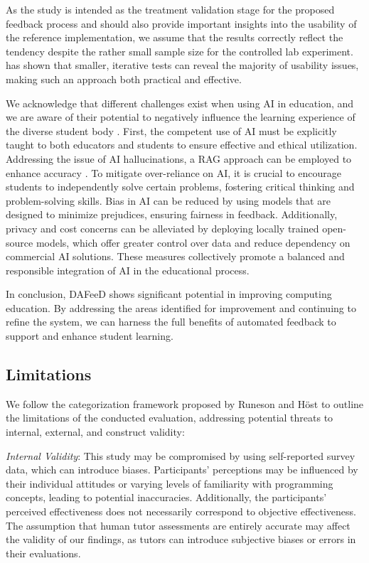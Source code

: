 \documentclass[sigconf,screen,review,anonymous]{acmart}
\begin{document}
As the study is intended as the treatment validation stage for the proposed feedback process and should also provide important insights into the usability of the reference implementation, we assume that the results correctly reflect the tendency despite the rather small sample size for the controlled lab experiment. 
\citet{nielsen:2000:WhyYouOnly} has shown that smaller, iterative tests can reveal the majority of usability issues, making such an approach both practical and effective.

We acknowledge that different challenges exist when using AI in education, and we are aware of their potential to negatively influence the learning experience of the diverse student body \cite{kasneci:2023:ChatGPTGoodOpportunitiesa}.
First, the competent use of AI must be explicitly taught to both educators and students to ensure effective and ethical utilization.
Addressing the issue of AI hallucinations, a RAG approach can be employed to enhance accuracy \cite{gao:2024:RetrievalAugmentedGenerationLarge}.
To mitigate over-reliance on AI, it is crucial to encourage students to independently solve certain problems, fostering critical thinking and problem-solving skills.
Bias in AI can be reduced by using models that are designed to minimize prejudices, ensuring fairness in feedback.
Additionally, privacy and cost concerns can be alleviated by deploying locally trained open-source models, which offer greater control over data and reduce dependency on commercial AI solutions.
These measures collectively promote a balanced and responsible integration of AI in the educational process.

In conclusion, DAFeeD shows significant potential in improving computing education.
By addressing the areas identified for improvement and continuing to refine the system, we can harness the full benefits of automated feedback to support and enhance student learning.


\subsection{Limitations}
We follow the categorization framework proposed by Runeson and Höst \cite{runeson:2009:GuidelinesConductingReporting} to outline the limitations of the conducted evaluation, addressing potential threats to internal, external, and construct validity:

\textit{Internal Validity}: This study may be compromised by using self-reported survey data, which can introduce biases. 
Participants' perceptions may be influenced by their individual attitudes or varying levels of familiarity with programming concepts, leading to potential inaccuracies.
Additionally, the participants' perceived effectiveness does not necessarily correspond to objective effectiveness.
The assumption that human tutor assessments are entirely accurate may affect the validity of our findings, as tutors can introduce subjective biases or errors in their evaluations.
\end{document}
